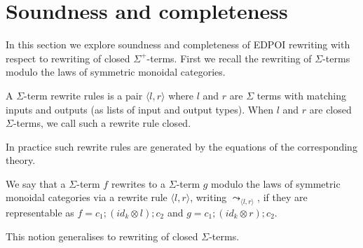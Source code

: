 \section{Soundness and completeness}

In this section we explore soundness and completeness of EDPOI rewriting with respect to rewriting of closed $\Sigma^{+}$-terms.
First we recall the rewriting of $\Sigma$-terms modulo the laws of symmetric monoidal categories.

\begin{definition}
	A $\Sigma$-term rewrite rules is a pair $\langle l, r \rangle$ where $l$ and $r$ are $\Sigma$ terms with matching inputs and outputs (as lists of input and output types).
	When $l$ and $r$ are closed $\Sigma$-terms, we call such a rewrite rule closed.
\end{definition}

In practice such rewrite rules are generated by the equations of the corresponding theory.

\begin{definition}%
	\label{def:rewrite}
	We say that a $\Sigma$-term $f$ rewrites to a $\Sigma$-term $g$ modulo the laws of symmetric monoidal categories via a rewrite rule $\langle l, r \rangle$, writing $\leadsto_{\langle l, r \rangle}$, if they are representable as
	$
		f = c_{1};(id_{k} \otimes l);c_{2} $ and $ g = c_{1};(id_{k} \otimes r);c_{2}
	$.
\end{definition}
This notion generalises to rewriting of closed $\Sigma$-terms.

